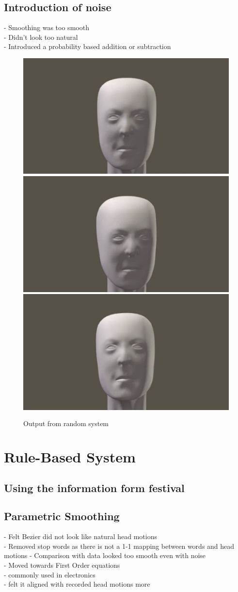 \documentclass[bsc,frontabs,twoside,singlespacing,parskip]{infthesis}
\begin{document}
\subsection{Introduction of noise}
- Smoothing was too smooth\\
- Didn't look too natural \\
- Introduced a probability based addition or subtraction\\

\begin{figure}
	\caption{Output from random system}
	\centering
	\includegraphics[width=.5\textwidth]{fightclub1.png}
	\includegraphics[width=.5\textwidth]{fightclub3.png}
	\includegraphics[width=.5\textwidth]{fightclub4.png}
\end{figure}

\section{Rule-Based System}

\subsection{Using the information form festival}

\subsection{Parametric Smoothing}
- Felt Bezier did not look like natural head motions \\
- Removed stop words as there is not a 1-1 mapping between words and head motions
- Comparison with data looked too smooth even with noise \\
- Moved towards First Order equations \\
- commonly used in electronics \\
- felt it aligned with recorded head motions more\\
	
\end{document}
